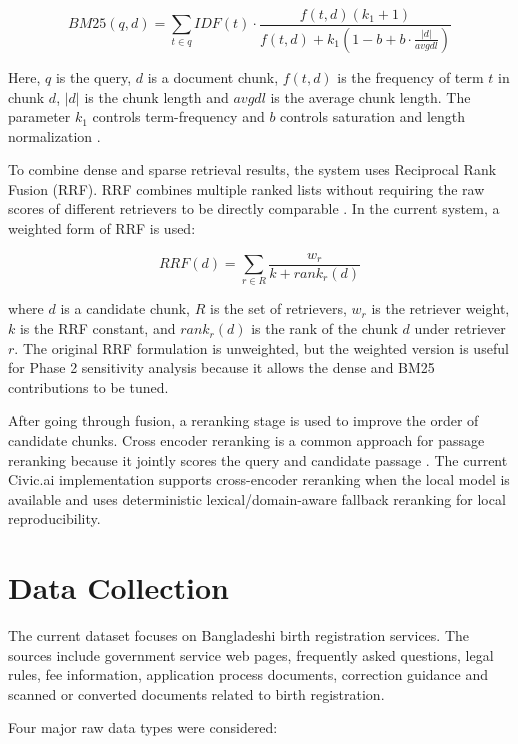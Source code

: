 \documentclass[12pt,oneside,openany]{report}
\begin{document}
\begin{equation}
BM25(q,d)=\sum_{t \in q} IDF(t)\cdot
\frac{f(t,d)(k_1+1)}
{f(t,d)+k_1(1-b+b\cdot\frac{|d|}{avgdl})}
\end{equation}

Here, $q$ is the query, $d$ is a document chunk, $f(t,d)$ is the frequency of term $t$ in chunk $d$, $|d|$ is the chunk length and $avgdl$ is the average chunk length. The parameter $k_1$ controls term-frequency and $b$ controls saturation and length normalization \cite{robertson2009bm25}.

To combine dense and sparse retrieval results, the system uses Reciprocal Rank Fusion (RRF). RRF combines multiple ranked lists without requiring the raw scores of different retrievers to be directly comparable \cite{cormack2009rrf}. In the current system, a weighted form of RRF is used:

\begin{equation}
RRF(d)=\sum_{r \in R}\frac{w_r}{k+rank_r(d)}
\end{equation}

where $d$ is a candidate chunk, $R$ is the set of retrievers, $w_r$ is the retriever weight, $k$ is the RRF constant, and $rank_r(d)$ is the rank of the chunk $d$ under retriever $r$. The original RRF formulation is unweighted, but the weighted version is useful for Phase 2 sensitivity analysis because it allows the dense and BM25 contributions to be tuned.

After going through fusion, a reranking stage is used to improve the order of candidate chunks. Cross encoder reranking is a common approach for passage reranking because it jointly scores the query and candidate passage \cite{nogueira2019passagebert}. The current Civic.ai implementation supports cross-encoder reranking when the local model is available and uses deterministic lexical/domain-aware fallback reranking for local reproducibility.

\section{Data Collection}

The current dataset focuses on Bangladeshi birth registration services. The sources include government service web pages, frequently asked questions, legal rules, fee information, application process documents, correction guidance and scanned or converted documents related to birth registration.

Four major raw data types were considered:
\end{document}
